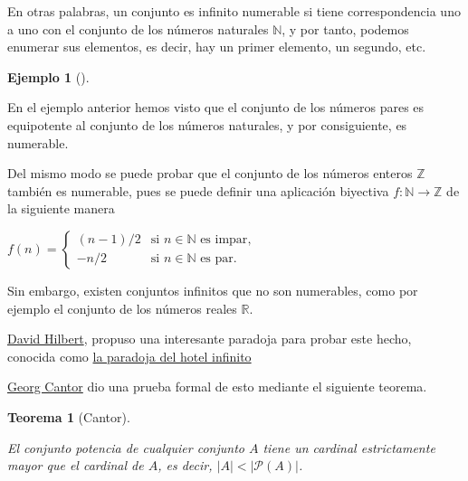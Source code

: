\documentclass[
  a4paper,
]{scrreport}
\theoremstyle{definition}
\theoremstyle{plain}
\newtheorem{theorem}{Teorema}[chapter]
\theoremstyle{plain}
\theoremstyle{definition}
\theoremstyle{definition}
\newtheorem{example}{Ejemplo}[chapter]
\theoremstyle{plain}
\theoremstyle{remark}
\begin{document}
En otras palabras, un conjunto es infinito numerable si tiene
correspondencia uno a uno con el conjunto de los números naturales
\(\mathbb{N}\), y por tanto, podemos enumerar sus elementos, es decir,
hay un primer elemento, un segundo, etc.

\begin{example}[]\protect\hypertarget{exm-enteros-equipotentes-naturales}{}\label{exm-enteros-equipotentes-naturales}

En el ejemplo anterior hemos visto que el conjunto de los números pares
es equipotente al conjunto de los números naturales, y por consiguiente,
es numerable.

Del mismo modo se puede probar que el conjunto de los números enteros
\(\mathbb{Z}\) también es numerable, pues se puede definir una
aplicación biyectiva \(f:\mathbb{N}\rightarrow \mathbb{Z}\) de la
siguiente manera

\(f(n)= \begin{cases} (n-1)/2 &\mbox{si } n\in \mathbb{N} \mbox{ es impar},\\ -n/2 &\mbox{si } n\in \mathbb{N} \mbox{ es par}. \end{cases}\)

\end{example}

Sin embargo, existen conjuntos infinitos que no son numerables, como por
ejemplo el conjunto de los números reales \(\mathbb{R}\).

\href{https://es.wikipedia.org/wiki/David_Hilbert}{David Hilbert},
propuso una interesante paradoja para probar este hecho, conocida como
\href{https://www.youtube.com/watch?v=4c8vG-mxuao}{la paradoja del hotel
infinito}

\href{https://en.wikipedia.org/wiki/Georg_Cantor}{Georg Cantor} dio una
prueba formal de esto mediante el siguiente teorema.

\begin{theorem}[Cantor]\protect\hypertarget{thm-cantor}{}\label{thm-cantor}

El conjunto potencia de cualquier conjunto \(A\) tiene un cardinal
estrictamente mayor que el cardinal de \(A\), es decir,
\(|A| < |\mathcal{P}(A)|\).

\end{theorem}
\end{document}
